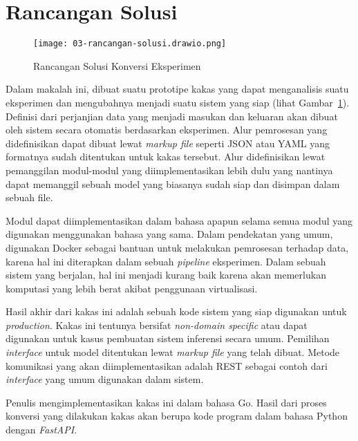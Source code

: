 \section{Rancangan Solusi}

\begin{figure}[ht]
  \centering
  \texttt{[image: 03-rancangan-solusi.drawio.png]}
  \caption{Rancangan Solusi Konversi Eksperimen}
  \label{fig:03-tool}
\end{figure}

Dalam makalah ini, dibuat suatu prototipe kakas yang dapat menganalisis suatu eksperimen dan mengubahnya menjadi suatu sistem yang siap (lihat Gambar~\ref{fig:03-tool}).
Definisi dari perjanjian data yang menjadi masukan dan keluaran akan dibuat oleh sistem secara otomatis berdasarkan eksperimen.
Alur pemrosesan yang didefinisikan dapat dibuat lewat \textit{markup file} seperti JSON atau YAML yang formatnya sudah ditentukan untuk kakas tersebut.
Alur didefinisikan lewat pemanggilan modul-modul yang diimplementasikan lebih dulu yang nantinya dapat memanggil sebuah model yang biasanya sudah siap dan disimpan dalam sebuah file.

Modul dapat diimplementasikan dalam bahasa apapun selama semua modul yang digunakan menggunakan bahasa yang sama.
Dalam pendekatan yang umum, digunakan Docker sebagai bantuan untuk melakukan pemrosesan terhadap data, karena hal ini diterapkan dalam sebuah \textit{pipeline} eksperimen.
Dalam sebuah sistem yang berjalan, hal ini menjadi kurang baik karena akan memerlukan komputasi yang lebih berat akibat penggunaan virtualisasi.

Hasil akhir dari kakas ini adalah sebuah kode sistem yang siap digunakan untuk \textit{production}.
Kakas ini tentunya bersifat \textit{non-domain specific} atau dapat digunakan untuk kasus pembuatan sistem inferensi secara umum.
Pemilihan \textit{interface} untuk model ditentukan lewat \textit{markup file} yang telah dibuat.
Metode komunikasi yang akan diimplementasikan adalah REST sebagai contoh dari \textit{interface} yang umum digunakan dalam sistem.

Penulis mengimplementasikan kakas ini dalam bahasa Go.
Hasil dari proses konversi yang dilakukan kakas akan berupa kode program dalam bahasa Python dengan \textit{FastAPI}.


